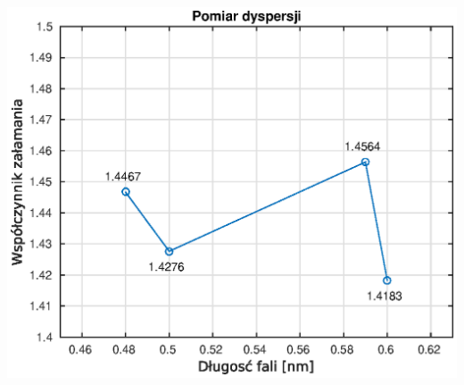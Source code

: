 \documentclass[12pt]{article}
\newenvironment{Figure}
  {\par\medskip\noindent\minipage{\linewidth}}
  {\endminipage\par\medskip}
\begin{document}
\begin{Figure}
\centering
\includegraphics[width=.8\linewidth]{untitled.eps}
\end{Figure}
\end{document}
